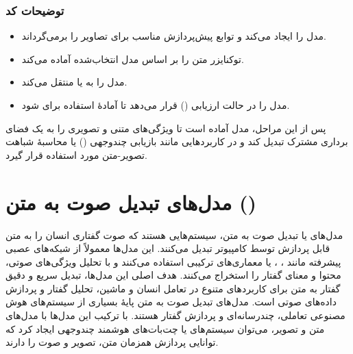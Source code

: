 \documentclass{article}
\begin{document}
\subsubsection{توضیحات کد}
\begin{itemize}
\item {} مدل را ایجاد می‌کند و توابع پیش‌پردازش مناسب برای تصاویر را برمی‌گرداند.

\item {} توکنایزر متن را بر اساس مدل انتخاب‌شده آماده می‌کند.

\item {} مدل را به  یا  منتقل می‌کند.

\item {} مدل را در حالت ارزیابی () قرار می‌دهد تا آمادهٔ استفاده برای  شود.

\end{itemize}

پس از این مراحل، مدل آماده است تا ویژگی‌های متنی و تصویری را به یک فضای برداری مشترک تبدیل کند و در کاربردهایی مانند بازیابی چندوجهی () یا محاسبهٔ شباهت تصویر-متن مورد استفاده قرار گیرد.


\section{مدل‌های تبدیل صوت به متن ()}
مدل‌های  یا تبدیل صوت به متن، سیستم‌هایی هستند که صوت گفتاری انسان را به متن قابل پردازش توسط کامپیوتر تبدیل می‌کنند.
این مدل‌ها معمولاً از شبکه‌های عصبی پیشرفته مانند ، ،  یا معماری‌های ترکیبی استفاده می‌کنند و با تحلیل ویژگی‌های صوتی، محتوا و معنای گفتار را استخراج می‌کنند.
هدف اصلی این مدل‌ها، تبدیل سریع و دقیق گفتار به متن برای کاربردهای متنوع در تعامل انسان و ماشین، تحلیل گفتار و پردازش داده‌های صوتی است.
مدل‌های تبدیل صوت به متن پایهٔ بسیاری از سیستم‌های هوش مصنوعی تعاملی، چندرسانه‌ای و پردازش گفتار هستند.
با ترکیب این مدل‌ها با مدل‌های متن و تصویر، می‌توان سیستم‌های  یا چت‌بات‌های هوشمند چندوجهی ایجاد کرد که توانایی پردازش همزمان متن، تصویر و صوت را دارند.
\end{document}
